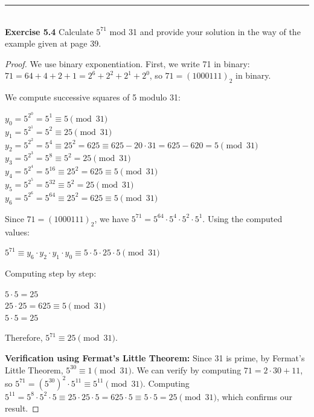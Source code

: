 \documentclass[a4paper]{article}
\begin{document}
\noindent\rule{12cm}{0.4pt}\\
\noindent \textbf{Exercise 5.4} Calculate $5^{71}$ mod 31 and provide your solution in the way of the example given at page 39.
\begin{proof}
We use binary exponentiation. First, we write 71 in binary: $71 = 64 + 4 + 2 + 1 = 2^6 + 2^2 + 2^1 + 2^0$, so $71 = (1000111)_2$ in binary.

We compute successive squares of 5 modulo 31:
\begin{center}
$y_0 = 5^{2^0} = 5^1 \equiv 5 \pmod{31}$\\
$y_1 = 5^{2^1} = 5^2 \equiv 25 \pmod{31}$\\
$y_2 = 5^{2^2} = 5^4 \equiv 25^2 = 625 \equiv 625 - 20 \cdot 31 = 625 - 620 = 5 \pmod{31}$\\
$y_3 = 5^{2^3} = 5^8 \equiv 5^2 = 25 \pmod{31}$\\
$y_4 = 5^{2^4} = 5^{16} \equiv 25^2 = 625 \equiv 5 \pmod{31}$\\
$y_5 = 5^{2^5} = 5^{32} \equiv 5^2 = 25 \pmod{31}$\\
$y_6 = 5^{2^6} = 5^{64} \equiv 25^2 = 625 \equiv 5 \pmod{31}$
\end{center}

Since $71 = (1000111)_2$, we have $5^{71} = 5^{64} \cdot 5^4 \cdot 5^2 \cdot 5^1$. Using the computed values:
\begin{center}
$5^{71} \equiv y_6 \cdot y_2 \cdot y_1 \cdot y_0 \equiv 5 \cdot 5 \cdot 25 \cdot 5 \pmod{31}$
\end{center}

Computing step by step:
\begin{center}
$5 \cdot 5 = 25$\\
$25 \cdot 25 = 625 \equiv 5 \pmod{31}$\\
$5 \cdot 5 = 25$
\end{center}

Therefore, $5^{71} \equiv 25 \pmod{31}$.

\textbf{Verification using Fermat's Little Theorem:} Since 31 is prime, by Fermat's Little Theorem, $5^{30} \equiv 1 \pmod{31}$. We can verify by computing $71 = 2 \cdot 30 + 11$, so $5^{71} = (5^{30})^2 \cdot 5^{11} \equiv 5^{11} \pmod{31}$. Computing $5^{11} = 5^8 \cdot 5^2 \cdot 5 \equiv 25 \cdot 25 \cdot 5 = 625 \cdot 5 \equiv 5 \cdot 5 = 25 \pmod{31}$, which confirms our result.
\end{proof}
\end{document}

